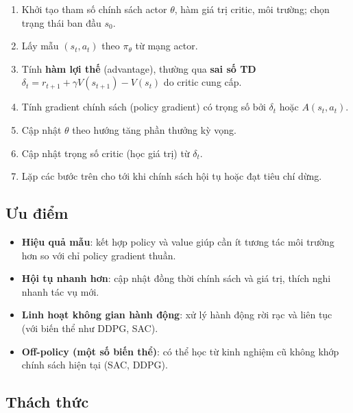 \begin{phuongphap}[title={Giải thuật (pseudo)}]
\begin{enumerate}
  \item Khởi tạo tham số chính sách actor $\theta$, hàm giá trị critic, môi trường; chọn trạng thái ban đầu $s_0$.
  \item Lấy mẫu $(s_t, a_t)$ theo $\pi_\theta$ từ mạng actor.
  \item Tính \textbf{hàm lợi thế} (advantage), thường qua \textbf{sai số TD} $\delta_t = r_{t+1} + \gamma V(s_{t+1}) - V(s_t)$ do critic cung cấp.
  \item Tính gradient chính sách (policy gradient) có trọng số bởi $\delta_t$ hoặc $A(s_t,a_t)$.
  \item Cập nhật $\theta$ theo hướng tăng phần thưởng kỳ vọng.
  \item Cập nhật trọng số critic (học giá trị) từ $\delta_t$.
  \item Lặp các bước trên cho tới khi chính sách hội tụ hoặc đạt tiêu chí dừng.
\end{enumerate}
\end{phuongphap}


\subsection{Ưu điểm}

\begin{tinhchat}[title={Ưu điểm actor--critic}]
\begin{itemize}
  \item \textbf{Hiệu quả mẫu}: kết hợp policy và value giúp cần ít tương tác môi trường hơn so với chỉ policy gradient thuần.
  \item \textbf{Hội tụ nhanh hơn}: cập nhật đồng thời chính sách và giá trị, thích nghi nhanh tác vụ mới.
  \item \textbf{Linh hoạt không gian hành động}: xử lý hành động rời rạc và liên tục (với biến thể như DDPG, SAC).
  \item \textbf{Off-policy (một số biến thể)}: có thể học từ kinh nghiệm cũ không khớp chính sách hiện tại (SAC, DDPG).
\end{itemize}
\end{tinhchat}

\subsection{Thách thức}

